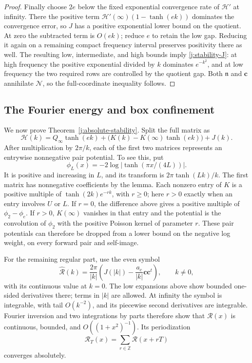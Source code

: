 \begin{proof}
Finally choose \(2e\) below the fixed exponential convergence rate of \(\mathcal H'\) at infinity. There the positive term
\(\mathcal H'(\infty)(1-\tanh(ek))\) dominates the convergence error, so \(J\) has a positive exponential lower bound on the quotient. At zero the subtracted term is \(O(ek)\); reduce \(e\) to retain the low gap. Reducing it again on a remaining compact frequency interval preserves positivity there as well. The resulting low, intermediate, and high bounds imply \eqref{j:stability-J}: at high frequency the positive exponential divided by \(k\) dominates \(e^{-k^2}\), and at low frequency the two required rows are controlled by the quotient gap. Both \(\mathfrak n\) and \(\boldsymbol c\) annihilate \(\mathcal N\), so the full-coordinate inequality follows.
\end{proof}

\subsection{The Fourier energy and box confinement}

We now prove Theorem~\ref{j:absolute-stability}. Split the full matrix as
\[
\mathcal H(k)
=Q_\infty\tanh(ek)
+\bigl(K(k)-K(\infty)\tanh(ek)\bigr)+J(k).
\]
After multiplication by \(2\pi/k\), each of the first two matrices represents an entrywise nonnegative pair potential. To see this, put
\[
\phi_L(x)=-2\log|\tanh(\pi x/(4L))|.
\]
It is positive and increasing in \(L\), and its transform is \(2\pi\tanh(Lk)/k\). The first matrix has nonnegative coefficients by the lemma. Each nonzero entry of \(K\) is a positive multiple of
\(\tanh(2k)e^{-rk}\), with \(r\ge0\); here \(r>0\) exactly when an entry involves \(U\) or \(L\). If \(r=0\), the difference above gives a positive multiple of \(\phi_2-\phi_e\). If \(r>0\), \(K(\infty)\) vanishes in that entry and the potential is the convolution of \(\phi_2\) with the positive Poisson kernel of parameter \(r\). These pair potentials can therefore be dropped from a lower bound on the negative log weight, on every forward pair and self-image.

For the remaining regular part, use the even symbol
\[
\widehat{\mathcal R}(k)
=\frac{2\pi}{|k|}
\left(J(|k|)-\frac{a_c}{|k|}\boldsymbol c\boldsymbol c^t\right),
\qquad k\ne0,
\]
with its continuous value at \(k=0\). The low expansions above show bounded one-sided derivatives there; terms in \(|k|\) are allowed. At infinity the symbol is integrable, with tail \(O(k^{-2})\), and its piecewise second derivatives are integrable. Fourier inversion and two integrations by parts therefore show that \(\mathcal R(x)\) is continuous, bounded, and \(O((1+x^2)^{-1})\). Its periodization
\[
\mathcal R_T(x)=\sum_{r\in\mathbb Z}\mathcal R(x+rT)
\]
converges absolutely.

